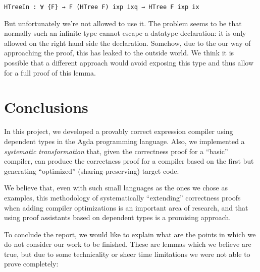 \documentclass[a4paper]{article}
\begin{document}
        \begin{verbatim}
HTreeIn : ∀ {F} → F (HTree F) ixp ixq → HTree F ixp ix
        \end{verbatim}
        
        But unfortunately we're not allowed to use it. The problem seems to be that normally such an infinite type cannot escape a datatype declaration: 
        it is only allowed on the right hand side the declaration. Somehow, due to the our way of approaching the proof, this has leaked to the outside world.
        We think it is possible that a different approach would avoid exposing this type and thus allow for a full proof of this lemma.

    \section{Conclusions}
    \label{sec:conclusions}
        In this project, we developed a provably correct expression compiler using dependent types in the Agda programming language.
        Also, we implemented a \emph{systematic transformation} that, given the correctness proof for
        a ``basic'' compiler, can produce the correctness proof for a compiler based on the first but
        generating ``optimized'' (sharing-preserving) target code.

        We believe that, even with such small languages as the ones we chose as examples,
        this methodology of systematically ``extending'' correctness proofs when adding compiler optimizations
        is an important area of research, and that using proof assistants based on dependent types is a
        promising approach.

        To conclude the report, we would like to explain what are the points in which we do not consider our work
        to be finished. These are lemmas which we believe are true, but due to some technicality or sheer
        time limitations we were not able to prove completely:
\end{document}

